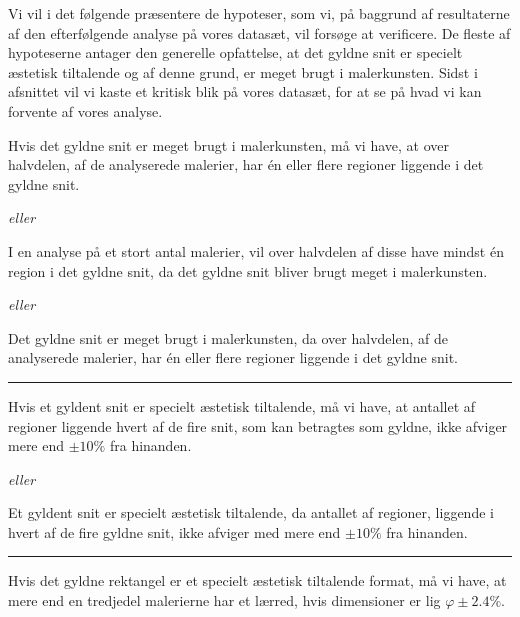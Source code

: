 {
{\sffamily Vi vil i det følgende præsentere de hypoteser, som vi, på
baggrund af resultaterne af den efterfølgende analyse på vores datasæt,
vil forsøge at verificere. De fleste af hypoteserne antager den
generelle opfattelse, at det gyldne snit er specielt æstetisk tiltalende
og af denne grund, er meget brugt i malerkunsten. Sidst i afsnittet vil
vi kaste et kritisk blik på vores datasæt, for at se på hvad vi kan
forvente af vores analyse.
}

\begin{hypotese}
    Hvis det gyldne snit er meget brugt i malerkunsten, må vi have, at
    over halvdelen, af de analyserede malerier, har én eller flere
    regioner liggende i det gyldne snit.
\end{hypotese}

\emph{eller}

\begin{hypotese}
    I en analyse på et stort antal malerier, vil over halvdelen af disse
    have mindst én region i det gyldne snit, da det gyldne snit bliver
    brugt meget i malerkunsten.
\end{hypotese}

\emph{eller}

\begin{hypotese}
    Det gyldne snit er meget brugt i malerkunsten, da over halvdelen, af
    de analyserede malerier, har én eller flere regioner liggende i det
    gyldne snit.
    \label{hypo_binaer}
\end{hypotese}

\hrule

\begin{hypotese}
    Hvis et gyldent snit er specielt æstetisk tiltalende, må vi have, at
    antallet af regioner liggende hvert af de fire snit, som kan
    betragtes som gyldne, ikke afviger mere end $\pm10\%$ fra hinanden.
\end{hypotese}

\emph{eller}

\begin{hypotese}
    Et gyldent snit er specielt æstetisk tiltalende, da antallet af
    regioner, liggende i hvert af de fire gyldne snit, ikke afviger med
    mere end $\pm10\%$ fra hinanden.
\end{hypotese}

\hrule

\begin{hypotese}
    Hvis det gyldne rektangel er et specielt æstetisk tiltalende format,
    må vi have, at mere end en tredjedel malerierne har et lærred, hvis
    dimensioner er lig $\varphi\pm2.4\%$.
\end{hypotese}

}
